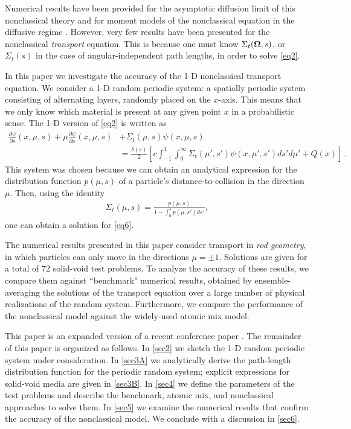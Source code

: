 \documentclass[12pt]{article}
\newcommand{\uomega}{{\bf \Omega}}
\begin{document}
Numerical results have been provided for the asymptotic diffusion limit of this nonclassical theory \cite{larvas11,vaslar09,vas13,vaslar14b} and for moment models of the nonclassical equation in the diffusive regime \cite{kry13}.
However, very few results have been presented for the nonclassical \textit{transport} equation.
This is because one must know $\Sigma_t(\uomega,s)$, or $\Sigma_t(s)$ in the case of angular-independent path lengths, in order to solve \cref{eq2}. 

In this paper we investigate the accuracy of the 1-D nonclassical transport equation.
We consider a 1-D random periodic system: a spatially periodic system consisting of alternating layers, randomly placed on the $x$-axis.
This means that we only know which material is present at any given point $x$ in a probabilistic sense.
The 1-D version of \cref{eq2} is written as
\begin{align}\label{eq6}
\frac{\partial\psi}{\partial s}(x,\mu,s) + \mu\frac{\partial \psi}{\partial x}(x,\mu,s) &+ \Sigma_t(\mu,s)\psi(x,\mu,s) 
\\& = \frac{\delta(s)}{2}\left[ c\int_{-1}^1\int_0^\infty \Sigma_t(\mu',s')\psi(x,\mu',s')ds' d\mu' + Q(x) \right]\,. \nonumber
\end{align}
This system was chosen because we can obtain an analytical expression for the distribution function $p(\mu,s)$ of a particle's distance-to-collision in the direction $\mu$.
Then, using the identity \cite{vaslar14a}
\begin{align}\label{eq7}
\Sigma_t(\mu,s)=\frac{p(\mu,s)}{1-\int_0^sp(\mu,s')ds'},
\end{align}
one can obtain a solution for \cref{eq6}.

The numerical results presented in this paper consider transport in {\em rod geometry}, in which particles can only move in the directions $\mu = \pm 1$.
Solutions are given for a total of 72 solid-void test problems.
To analyze the accuracy of these results, we compare them against ``benchmark" numerical results, obtained by ensemble-averaging the solutions of the transport equation over a large number of physical realizations of the random system.
Furthermore, we compare the performance of the nonclassical model against the widely-used atomic mix model.

This paper is an expanded version of a recent conference paper \cite{mc15}.
The remainder of this paper is organized as follows.
In \cref{sec2} we sketch the 1-D random periodic system under consideration.
In \cref{sec3A} we analytically derive the path-length distribution function for the periodic random system; explicit expressions for solid-void media are given in \cref{sec3B}.
In \cref{sec4} we define the parameters of the test problems and describe the benchmark, atomic mix, and nonclassical approaches to solve them.
In \cref{sec5} we examine the numerical results that confirm the accuracy of the nonclassical model.
We conclude with a discussion in \cref{sec6}.
\end{document}
